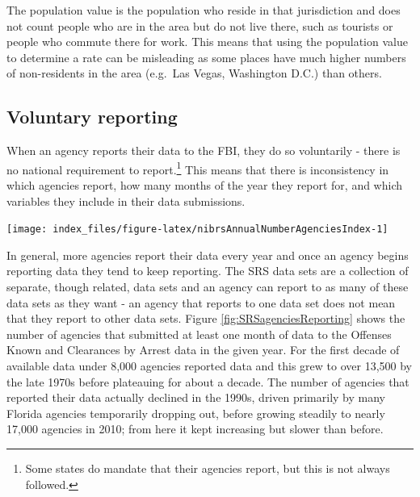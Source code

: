 \documentclass[
]{krantz}
\let\origfigure\figure
\let\endorigfigure\endfigure
\renewenvironment{figure}[1][2] {
    \expandafter\origfigure\expandafter[H]
} {
    \endorigfigure
}
\begin{document}
The population value is the population who reside in that
jurisdiction and does not count people who are in the area
but do not live there, such as tourists or people who
commute there for work. This means that using the population
value to determine a rate can be misleading as some places
have much higher numbers of non-residents in the area
(e.g.~Las Vegas, Washington D.C.) than others.

\subsection{Voluntary reporting}\label{voluntary}

When an agency reports their data to the FBI, they do so
voluntarily - there is no national requirement to
report.\footnote{Some states do mandate that their agencies
  report, but this is not always followed.} This means that
there is inconsistency in which agencies report, how many
months of the year they report for, and which variables they
include in their data submissions.

\begin{figure}

{\centering \texttt{[image: index\_files/figure-latex/nibrsAnnualNumberAgenciesIndex-1]} 

}

\caption{The annual number of police agencies that report data to NIBRS.}\label{fig:nibrsAnnualNumberAgenciesIndex}
\end{figure}

In general, more agencies report their data every year and
once an agency begins reporting data they tend to keep
reporting. The SRS data sets are a collection of separate,
though related, data sets and an agency can report to as many
of these data sets as they want - an agency that reports to
one data set does not mean that they report to other
data sets. Figure \ref{fig:SRSagenciesReporting} shows the
number of agencies that submitted at least one month of data
to the Offenses Known and Clearances by Arrest data in the
given year. For the first decade of available data under
8,000 agencies reported data and this grew to over 13,500 by
the late 1970s before plateauing for about a decade. The
number of agencies that reported their data actually
declined in the 1990s, driven primarily by many Florida
agencies temporarily dropping out, before growing steadily
to nearly 17,000 agencies in 2010; from here it kept
increasing but slower than before.
\end{document}
